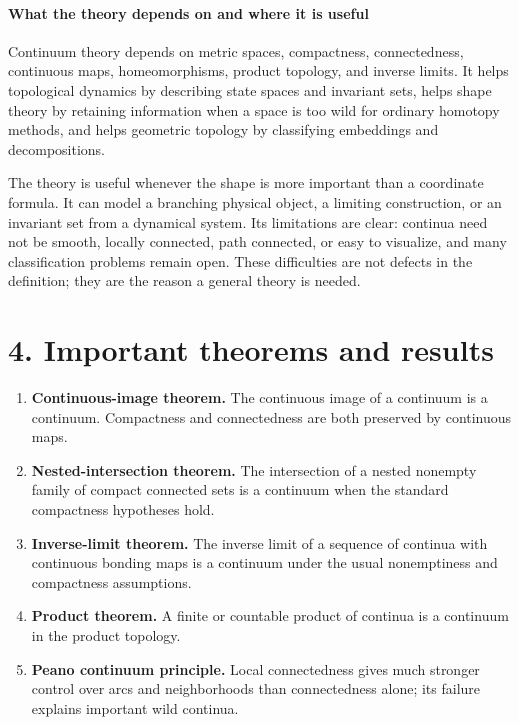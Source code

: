 \paragraph{What the theory depends on and where it is useful}

Continuum theory depends on metric spaces, compactness, connectedness, continuous maps, homeomorphisms, product topology, and inverse limits. It helps topological dynamics by describing state spaces and invariant sets, helps shape theory by retaining information when a space is too wild for ordinary homotopy methods, and helps geometric topology by classifying embeddings and decompositions.

The theory is useful whenever the shape is more important than a coordinate formula. It can model a branching physical object, a limiting construction, or an invariant set from a dynamical system. Its limitations are clear: continua need not be smooth, locally connected, path connected, or easy to visualize, and many classification problems remain open. These difficulties are not defects in the definition; they are the reason a general theory is needed.

\section*{4. Important theorems and results}
\begin{enumerate}[leftmargin=*,itemsep=0.35em]

\item \textbf{Continuous-image theorem.} The continuous image of a continuum is a continuum. Compactness and connectedness are both preserved by continuous maps. \cite{continuum_theory_ref2}

\item \textbf{Nested-intersection theorem.} The intersection of a nested nonempty family of compact connected sets is a continuum when the standard compactness hypotheses hold. \cite{continuum_theory_ref1}

\item \textbf{Inverse-limit theorem.} The inverse limit of a sequence of continua with continuous bonding maps is a continuum under the usual nonemptiness and compactness assumptions. \cite{continuum_theory_ref1}

\item \textbf{Product theorem.} A finite or countable product of continua is a continuum in the product topology. \cite{continuum_theory_ref4}

\item \textbf{Peano continuum principle.} Local connectedness gives much stronger control over arcs and neighborhoods than connectedness alone; its failure explains important wild continua. \cite{continuum_theory_ref3}
\end{enumerate}

